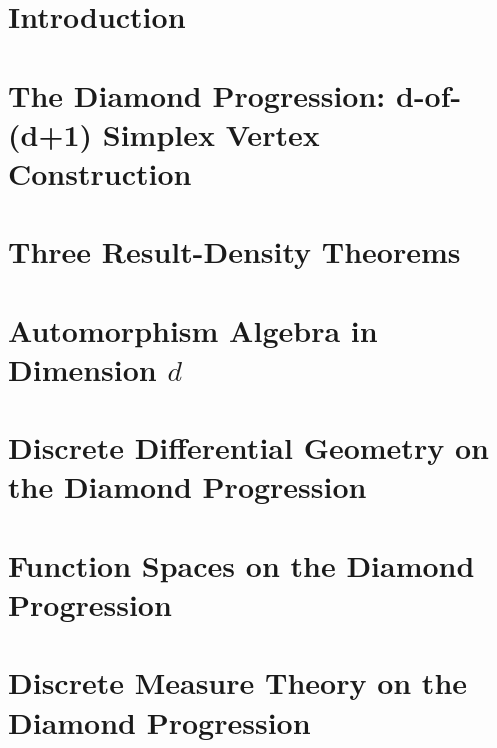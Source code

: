 \documentclass[12pt, letterpaper]{article}
\begin{document}
\newpage

\begin{abstract}
    
\end{abstract}

\newpage
\tableofcontents
\newpage

\section{Introduction}


\section{The Diamond Progression: d-of-(d+1) Simplex Vertex Construction}


\section{Three Result-Density Theorems}


\section{Automorphism Algebra in Dimension $d$}


\section{Discrete Differential Geometry on the Diamond Progression}


\section{Function Spaces on the Diamond Progression}


\section{Discrete Measure Theory on the Diamond Progression}

\end{document}
